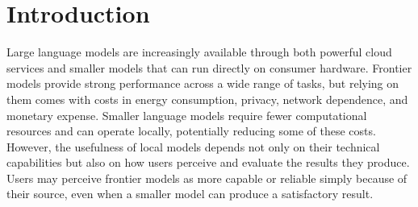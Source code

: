 \documentclass[manuscript,review]{acmart}
\begin{document}
\begin{CCSXML}

\end{CCSXML}



\maketitle


\section{Introduction}

Large language models are increasingly available through both powerful cloud services and smaller models that can run directly on consumer hardware. Frontier models provide strong performance across a wide range of tasks, but relying on them comes with costs in energy consumption, privacy, network dependence, and monetary expense. Smaller language models require fewer computational resources and can operate locally, potentially reducing some of these costs. However, the usefulness of local models depends not only on their technical capabilities but also on how users perceive and evaluate the results they produce. Users may perceive frontier models as more capable or reliable simply because of their source, even when a smaller model can produce a satisfactory result.
\end{document}
